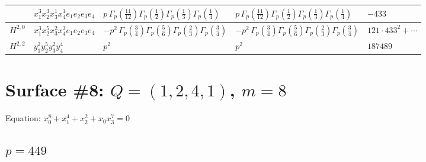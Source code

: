 \documentclass[11pt]{article}
\begin{document}
\begin{table}[ht]
{\begin{tabular}{@{}lllll@{}}
 & $x_{1}^{3} x_{2}^{3} x_{3}^{1} x_{4}^{1}  e_{1} e_{2} e_{3} e_{4}$ & $p \, \Gamma_p \left( \frac{11}{12} \right) \Gamma_p \left( \frac{1}{2} \right) \Gamma_p \left( \frac{1}{3} \right) \Gamma_p \left( \frac{1}{4} \right)$ & $p \, \Gamma_p \left( \frac{11}{12} \right) \Gamma_p \left( \frac{1}{2} \right) \Gamma_p \left( \frac{1}{3} \right) \Gamma_p \left( \frac{1}{4} \right)$ & $-433$ \\
\midrule
$H^{2,0}$ & $x_{1}^{3} x_{2}^{5} x_{3}^{2} x_{4}^{3}  e_{1} e_{2} e_{3} e_{4}$ & $- p^{2} \, \Gamma_p \left( \frac{3}{4} \right) \Gamma_p \left( \frac{5}{6} \right) \Gamma_p \left( \frac{2}{3} \right) \Gamma_p \left( \frac{3}{4} \right)$ & $- p^{2} \, \Gamma_p \left( \frac{3}{4} \right) \Gamma_p \left( \frac{5}{6} \right) \Gamma_p \left( \frac{2}{3} \right) \Gamma_p \left( \frac{3}{4} \right)$ & $121{\cdot}433^{2}{+}\cdots$ \\
\midrule
$H^{2,2}$ & $y_{1}^{2} y_{2}^{5} y_{3}^{2} y_{4}^{4}$ & $p^{2} \,$ & $p^{2} \,$ & $187489$ \\
\bottomrule
\end{tabular}
}
\renewcommand{\arraystretch}{1.0}
\end{table}

\newpage

\section*{Surface \#8: $Q=(1, 2, 4, 1)$, $m=8$}

Equation: $x_0^{8} + x_1^{4} + x_2^{2} + x_0 x_3^{7} = 0$

\subsection*{$p = 449$}
\end{document}
